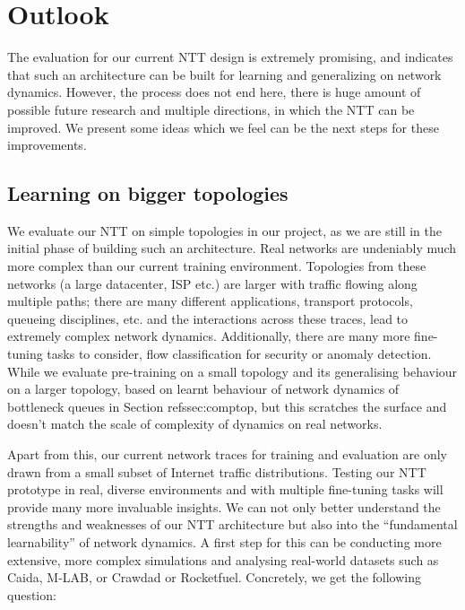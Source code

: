 \chapter{Outlook}
\label{cha:outlook}

The evaluation for our current NTT design is extremely promising, and indicates that such an architecture can be built for learning and generalizing on network dynamics. However, the process does not end here, there is huge amount of possible future research and multiple directions, in which the NTT can be improved. We present some ideas which we feel can be the next steps for these improvements.

\section{Learning on bigger topologies}
\label{sec:biggertopos}

We evaluate our NTT on simple topologies in our project, as we are still in the initial phase of building such an architecture. Real networks are undeniably much more complex than our current training environment. Topologies from these networks (\eg a large datacenter, ISP etc.) are larger with traffic flowing along multiple paths; there are many different applications, transport protocols, queueing disciplines, etc. and the interactions across these traces, lead to extremely complex network dynamics. Additionally, there are many more fine-tuning tasks to consider, \eg flow classification for security or anomaly detection. While we evaluate pre-training on a small topology and its generalising behaviour on a larger topology, based on learnt behaviour of network dynamics of bottleneck queues in Section ref{ssec:comptop}, but this scratches the surface and doesn't match the scale of complexity of dynamics on real networks. 

Apart from this, our current network traces for training and evaluation are only drawn from a small subset of Internet traffic distributions\cite{homa}. Testing our NTT prototype in real, diverse environments and with multiple fine-tuning tasks will provide many more invaluable insights. We can not only better understand the strengths and weaknesses of our NTT architecture but also into the ``fundamental learnability'' of network dynamics. A first step for this can be conducting more extensive, more complex simulations and analysing real-world datasets such as Caida\cite{caida}, M-LAB\cite{mlab}, or Crawdad\cite{crawdad} or Rocketfuel\cite{rocketfuel}. Concretely, we get the following question:  

